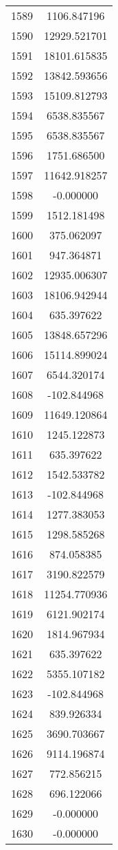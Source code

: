 \documentclass[12pt]{article}
\begin{document}
\begin{longtable}{@{}cc@{}}
1589 & 1106.847196 \\
1590 & 12929.521701 \\
1591 & 18101.615835 \\
1592 & 13842.593656 \\
1593 & 15109.812793 \\
1594 & 6538.835567 \\
1595 & 6538.835567 \\
1596 & 1751.686500 \\
1597 & 11642.918257 \\
1598 & -0.000000 \\
1599 & 1512.181498 \\
1600 & 375.062097 \\
1601 & 947.364871 \\
1602 & 12935.006307 \\
1603 & 18106.942944 \\
1604 & 635.397622 \\
1605 & 13848.657296 \\
1606 & 15114.899024 \\
1607 & 6544.320174 \\
1608 & -102.844968 \\
1609 & 11649.120864 \\
1610 & 1245.122873 \\
1611 & 635.397622 \\
1612 & 1542.533782 \\
1613 & -102.844968 \\
1614 & 1277.383053 \\
1615 & 1298.585268 \\
1616 & 874.058385 \\
1617 & 3190.822579 \\
1618 & 11254.770936 \\
1619 & 6121.902174 \\
1620 & 1814.967934 \\
1621 & 635.397622 \\
1622 & 5355.107182 \\
1623 & -102.844968 \\
1624 & 839.926334 \\
1625 & 3690.703667 \\
1626 & 9114.196874 \\
1627 & 772.856215 \\
1628 & 696.122066 \\
1629 & -0.000000 \\
1630 & -0.000000 \\

\end{longtable}
\end{document}
